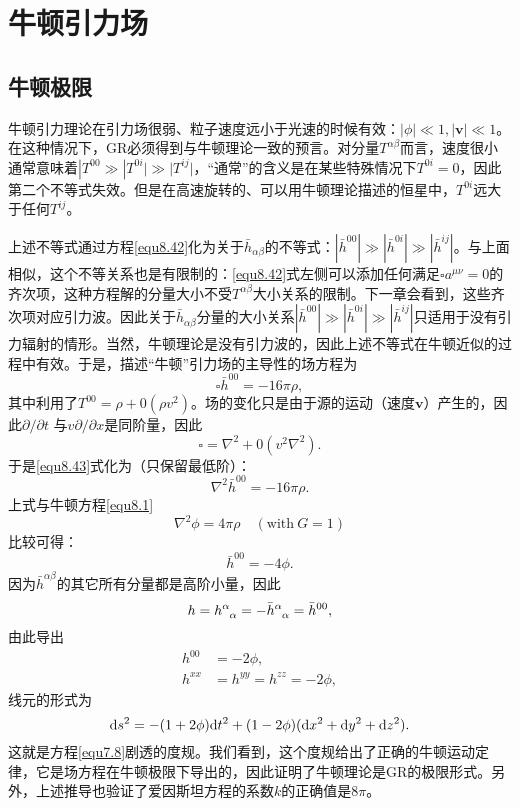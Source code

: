 \section{牛顿引力场}
\label{sec8.4}


\subsection*{牛顿极限}
牛顿引力理论在引力场很弱、粒子速度远小于光速的时候有效：$|\phi| \ll 1, |\bm{v}| \ll 1$。在这种情况下，GR必须得到与牛顿理论一致的预言。对分量$T^{\alpha \beta}$而言，速度很小通常意味着$|T^{00} \gg |T^{0i}| \gg |T^{ij}|$，“通常”的含义是在某些特殊情况下$T^{0i} = 0$，因此第二个不等式失效。但是在高速旋转的、可以用牛顿理论描述的恒星中，$T^{0i}$远大于任何$T^{ij}$。

上述不等式通过方程\eqref{equ8.42}化为关于$\bar{h}_{\alpha \beta}$的不等式：$|\bar{h}^{00}| \gg |\bar{h}^{0i}| \gg |\bar{h}^{ij}|$。与上面相似，这个不等关系也是有限制的：\eqref{equ8.42}式左侧可以添加任何满足$\square a^{\mu \nu} = 0$的齐次项，这种方程解的分量大小不受$T^{\alpha \beta}$大小关系的限制。下一章会看到，这些齐次项对应引力波。因此关于$\bar{h}_{\alpha \beta}$分量的大小关系$|\bar{h}^{00}| \gg |\bar{h}^{0i}| \gg |\bar{h}^{ij}|$只适用于没有引力辐射的情形。当然，牛顿理论是没有引力波的，因此上述不等式在牛顿近似的过程中有效。于是，描述“牛顿”引力场的主导性的场方程为
\begin{equation}
    \square \bar{h}^{00} = -16 \pi \rho, \label{equ8.43}
\end{equation}
其中利用了$T^{00} = \rho + 0(\rho v^2)$。场的变化只是由于源的运动（速度$\bm{v}$）产生的，因此$\partial / \partial t$ 与$v \partial / \partial x$是同阶量，因此
\begin{equation}
    \square = \nabla^2 + 0(v^2 \nabla^2). \label{equ8.44}
\end{equation}
于是\eqref{equ8.43}式化为（只保留最低阶）：
\begin{equation}
    \nabla^2 \bar{h}^{00} = -16\pi \rho. \label{equ8.45}
\end{equation}
上式与牛顿方程\eqref{equ8.1}
\[
    \nabla^2 \phi = 4 \pi \rho \quad (\text{with} \ G = 1)
\]
比较可得：
\begin{equation}
    \bar{h}^{00} = -4 \phi. \label{equ8.46}
\end{equation}
因为$\bar{h}^{\alpha \beta}$的其它所有分量都是高阶小量，因此
\begin{equation}
    h = h\indices{^\alpha_\alpha} = - \bar{h}\indices{^\alpha_\alpha} = \bar{h}^{00}, \label{equ8.47}
\end{equation}
由此导出
\begin{align}
    h^{00} &= -2 \phi, \label{eq8.48} \\
    h^{xx} &= h^{yy} = h^{zz} = -2\phi, \label{equ8.49}
\end{align}
线元的形式为
\begin{equation}
    \mathrm{d} s^2 = - (1 + 2\phi) \mathrm{d} t^2 + (1 - 2\phi) (\mathrm{d} x^2 + \mathrm{d} y^2 + \mathrm{d} z^2). \label{equ8.50}
\end{equation}
这就是方程\eqref{equ7.8}剧透的度规。我们看到，这个度规给出了正确的牛顿运动定律，它是场方程在牛顿极限下导出的，因此证明了牛顿理论是GR的极限形式。另外，上述推导也验证了爱因斯坦方程的系数$k$的正确值是$8\pi$。


